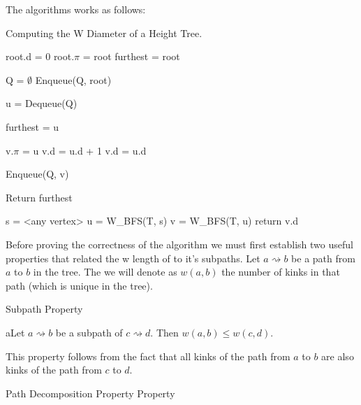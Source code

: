 The algorithms works as follows:


\begin{algorithm}
\caption{Computing the W Diameter of a Height Tree.}

\begin{algorithmic}[1]

    \State root.d = 0
    \State root.$\pi$ = root
    \State furthest = root

    \State Q = $\emptyset$
    \State Enqueue(Q, root)

        \State u = Dequeue(Q)

            \State furthest = u
        \EndIf

                \State v.$\pi$ = u
                    \State v.d = u.d + 1
                \Else
                    \State v.d = u.d
                \EndIf

                \State Enqueue(Q, v)

            \EndIf
        \EndFor
    \EndWhile
    \State Return furthest
\EndFunction

    \State s = <any vertex>
    \State u = W\_BFS(T, s)
    \State v = W\_BFS(T, u)
    \State return v.d
\EndFunction

\end{algorithmic}
\end{algorithm}

Before proving the correctness of the algorithm we must first establish two useful properties that related the w length of to it's subpaths.
Let $a \rightsquigarrow b$ be a path from $a$ to $b$ in the tree. The we will denote as $w(a, b)$ the number of kinks in that path (which is unique in the tree).

\begin{defn} Subpath Property  \end{defn}

aLet $a \rightsquigarrow b$ be a subpath of $c \rightsquigarrow d$. Then $w(a, b) \le w(c, d)$. 

This property follows from the fact that all kinks of the path from $a$ to $b$ are also kinks of the path from $c$ to $d$.

\begin{defn} Path Decomposition Property Property  \end{defn}

